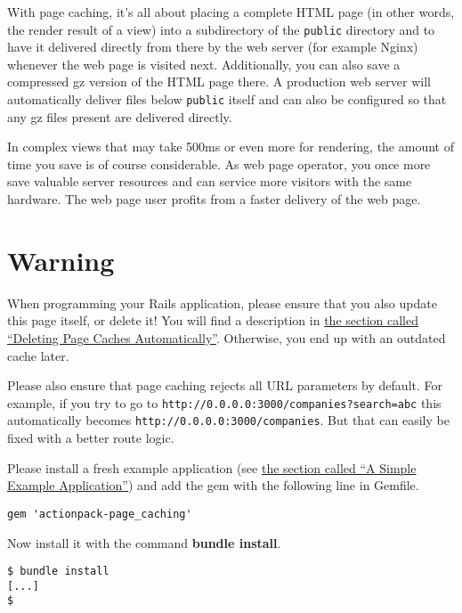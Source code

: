 \documentclass[a4paper]{book}
\begin{document}
With page caching, it's all about placing a complete HTML page (in other words, the render result of a view) into a subdirectory of the \texttt{public} directory and to have it delivered directly from there by the web server (for example Nginx) whenever the web page is visited next. Additionally, you can also save a compressed gz version of the HTML page there. A production web server will automatically deliver files below \texttt{public} itself and can also be configured so that any gz files present are delivered directly.

In complex views that may take 500ms or even more for rendering, the amount of time you save is of course considerable. As web page operator, you once more save valuable server resources and can service more visitors with the same hardware. The web page user profits from a faster delivery of the web page.

\section{Warning}\label{warning-15}

When programming your Rails application, please ensure that you also update this page itself, or delete it! You will find a description in \hyperref[pageux5fcachesux5fautomatischux5floeschen]{the section called “Deleting Page Caches Automatically”}. Otherwise, you end up with an outdated cache later.

Please also ensure that page caching rejects all URL parameters by default. For example, if you try to go to \texttt{http://0.0.0.0:3000/companies?search=abc} this automatically becomes \texttt{http://0.0.0.0:3000/companies}. But that can easily be fixed with a better route logic.

Please install a fresh example application (see \hyperref[cachingux5fbeispielapplikation]{the section called “A Simple Example Application”}) and add the gem with the following line in Gemfile.

\begin{shaded}\begin{verbatim}
gem 'actionpack-page_caching'
\end{verbatim}\end{shaded}

Now install it with the command \textbf{bundle install}.

\begin{shaded}\begin{verbatim}
$ bundle install
[...]
$
\end{verbatim}\end{shaded}
\end{document}
